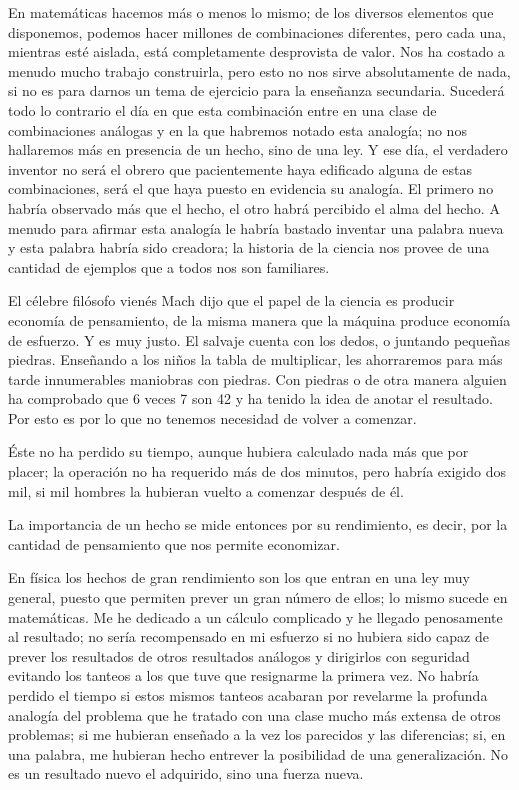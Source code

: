 \documentclass[a4paper, 12pt]{article}
\begin{document}
En matemáticas hacemos más o menos lo mismo; de los diversos
elementos que disponemos, podemos hacer millones de combinaciones
diferentes, pero cada una, mientras esté aislada, está completamente
desprovista de valor. Nos ha costado a menudo mucho trabajo construirla,
pero esto no nos sirve absolutamente de nada, si no es para darnos un tema
de ejercicio para la enseñanza secundaria. Sucederá todo lo
contrario el día en que esta combinación entre en una clase de
combinaciones análogas y en la que habremos notado esta analogía;
no nos hallaremos más en presencia de un hecho, sino de una ley. Y ese día, el verdadero inventor no será el obrero que pacientemente haya
edificado alguna de estas combinaciones, será el que haya puesto en
evidencia su analogía. El primero no habría observado más que
el hecho, el otro habrá percibido el alma del hecho. A menudo para
afirmar esta analogía le habría bastado inventar una palabra nueva
y esta palabra habría sido creadora; la historia de la ciencia nos
provee de una cantidad de ejemplos que a todos nos son familiares.



El célebre filósofo vienés Mach dijo que el papel de la ciencia
es producir economía de pensamiento, de la misma manera que la máquina produce economía de esfuerzo. Y es muy justo. El salvaje cuenta
con los dedos, o juntando pequeñas piedras. Enseñando a los niños la tabla de multiplicar, les ahorraremos para más tarde innumerables
maniobras con piedras. Con piedras o de otra manera alguien ha comprobado
que 6 veces 7 son 42 y ha tenido la idea de anotar el resultado. Por esto es
por lo que no tenemos necesidad de volver a comenzar.

Éste no ha perdido su tiempo, aunque hubiera calculado nada más que
por placer; la operación no ha requerido más de dos minutos, pero
habría exigido dos mil, si mil hombres la hubieran vuelto a comenzar
después de él.

La importancia de un hecho se mide entonces por su rendimiento, es decir,
por la cantidad de pensamiento que nos permite economizar.

En física los hechos de gran rendimiento son los que entran en una ley
muy general, puesto que permiten prever un gran número de ellos; lo
mismo sucede en matemáticas. Me he dedicado a un cálculo complicado
y he llegado penosamente al resultado; no sería recompensado en mi
esfuerzo si no hubiera sido capaz de prever los resultados de otros
resultados análogos y dirigirlos con seguridad evitando los tanteos a
los que tuve que resignarme la primera vez. No habría perdido el tiempo
si estos mismos tanteos acabaran por revelarme la profunda analogía del
problema que he tratado con una clase mucho más extensa de otros
problemas; si me hubieran enseñado a la vez los parecidos y las
diferencias; si, en una palabra, me hubieran hecho entrever la posibilidad
de una generalización. No es un resultado nuevo el adquirido, sino una
fuerza nueva.
\end{document}
